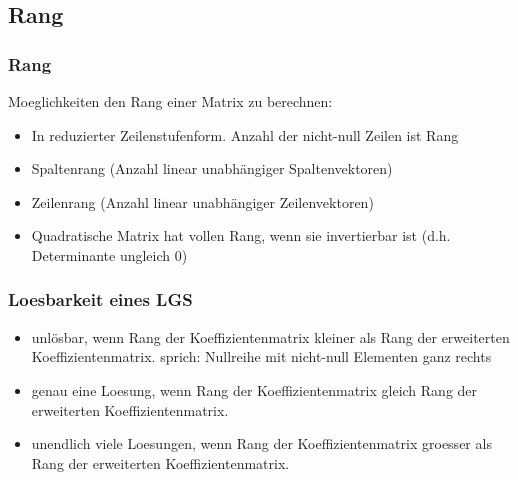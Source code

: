 \subsection{Rang}
\begin{frame}
    \frametitle{Rang}
    Moeglichkeiten den Rang einer Matrix zu berechnen:
    \begin{itemize}
        \item In reduzierter Zeilenstufenform.
        Anzahl der nicht-null Zeilen ist Rang
        \item Spaltenrang (Anzahl linear unabhängiger Spaltenvektoren)
        \item Zeilenrang (Anzahl linear unabhängiger Zeilenvektoren)
        \item Quadratische Matrix hat vollen Rang, wenn sie invertierbar ist (d.h. Determinante ungleich 0)
    \end{itemize}
\end{frame}

\begin{frame}
    \frametitle{Loesbarkeit eines LGS}
    \begin{itemize}
        \item unl\"osbar, wenn Rang der Koeffizientenmatrix kleiner als Rang der erweiterten Koeffizientenmatrix.
        sprich: Nullreihe mit nicht-null Elementen ganz rechts
        \item genau eine Loesung, wenn Rang der Koeffizientenmatrix gleich Rang der erweiterten Koeffizientenmatrix.
        \item unendlich viele Loesungen, wenn Rang der Koeffizientenmatrix groesser als Rang der erweiterten Koeffizientenmatrix.
    \end{itemize}
\end{frame}
